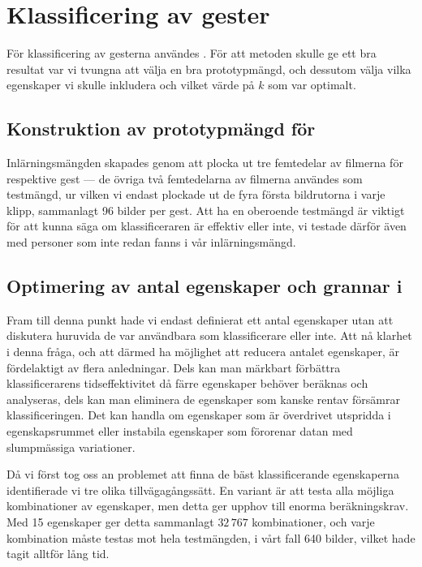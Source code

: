 \documentclass[../rapport_MVEX01-11-05]{subfiles}
\begin{document}
\section{Klassificering av gester} 

För klassificering av gesterna användes \knn. För att metoden skulle
ge ett bra resultat var vi tvungna att välja
en bra prototypmängd, och dessutom välja vilka egenskaper vi skulle inkludera
och vilket värde på $k$ som var optimalt.

\subsection{Konstruktion av prototypmängd för \knn}
Inlärningsmängden skapades genom att plocka ut tre femtedelar av filmerna för
respektive gest --- de övriga två femtedelarna av filmerna 
användes som testmängd, ur vilken vi endast plockade ut
de fyra första bildrutorna i varje klipp, sammanlagt 96 bilder per gest.
Att ha en oberoende testmängd är viktigt för att kunna säga om klassificeraren är
effektiv eller inte, vi testade därför även med personer som inte redan 
fanns i vår inlärningsmängd.

\subsection{Optimering av antal egenskaper och grannar i \knn}
Fram till denna punkt hade vi endast definierat ett antal egenskaper utan att
diskutera huruvida de var användbara som klassificerare eller inte. Att nå
klarhet i denna fråga, och att därmed ha möjlighet att reducera antalet
egenskaper, är
fördelaktigt av flera anledningar. Dels kan man märkbart förbättra
klassificerarens
tidseffektivitet då färre egenskaper behöver beräknas och analyseras, dels kan man
eliminera de egenskaper som kanske rentav försämrar klassificeringen.
Det kan handla om egenskaper som är överdrivet utspridda i
egenskapsrummet eller instabila egenskaper som förorenar datan med slumpmässiga
variationer.

Då vi först tog oss an problemet att finna de bäst klassificerande
egenskaperna identifierade vi tre olika tillvägagångssätt. En variant är att
testa alla möjliga kombinationer av egenskaper,
men detta ger upphov till enorma beräkningskrav. Med 15
egenskaper ger detta sammanlagt $32\,767$ kombinationer, och varje kombination
måste testas mot hela testmängden, i vårt fall 640 bilder, vilket hade tagit
alltför lång tid.
 
\end{document}
